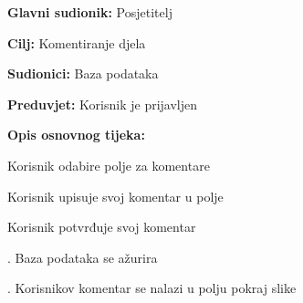 					\noindent {}
					\begin{packed_item}
						
						\item \textbf{Glavni sudionik: }Posjetitelj
						\item  \textbf{Cilj:} Komentiranje djela						
						\item \textbf{Sudionici:} Baza podataka
						\item  \textbf{Preduvjet:} Korisnik je prijavljen
						\item  \textbf{Opis osnovnog tijeka:}
						
						\item[] \begin{packed_enum}
							
							\item Korisnik odabire polje za komentare
							\item Korisnik upisuje svoj komentar u polje
							\item Korisnik potvrđuje svoj komentar
							\item . Baza podataka se ažurira
							\item . Korisnikov komentar se nalazi u polju pokraj slike

						\end{packed_enum}
					\end{packed_item}
					
